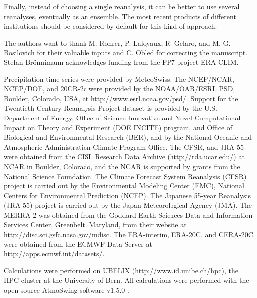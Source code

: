 \documentclass{ametsoc}
\begin{document}
	Finally, instead of choosing a single reanalysis, it can be better to use several reanalyses, eventually as an ensemble. The most recent products of different institutions should be considered by default for this kind of approach.
	
	
	
	
	
	\acknowledgments
	The authors want to thank M. Rohrer, P. Laloyaux, R. Gelaro, and M. G. Bosilovich for their valuable inputs and C. Obled for correcting the manuscript. Stefan Br\"{o}nnimann acknowledges funding from the FP7 project ERA-CLIM.
	
	Precipitation time series were provided by MeteoSwiss. The NCEP/NCAR, NCEP/DOE, and 20CR-2c were provided by the NOAA/OAR/ESRL PSD, Boulder, Colorado, USA, at http://www.esrl.noaa.gov/psd/. Support for the Twentieth Century Reanalysis Project dataset is provided by the U.S. Department of Energy, Office of Science Innovative and Novel Computational Impact on Theory and Experiment (DOE INCITE) program, and Office of Biological and Environmental Research (BER), and by the National Oceanic and Atmospheric Administration Climate Program Office. The CFSR, and JRA-55 were obtained from the CISL Research Data Archive (http://rda.ucar.edu/) at NCAR in Boulder, Colorado, and the NCAR is supported by grants from the National Science Foundation. The Climate Forecast System Reanalysis (CFSR) project is carried out by the Environmental Modeling Center (EMC), National Centers for Environmental Prediction (NCEP). The Japanese 55-year Reanalysis (JRA-55) project is carried out by the Japan Meteorological Agency (JMA). The MERRA-2 was obtained from the Goddard Earth Sciences Data and Information Services Center, Greenbelt, Maryland, from their website at http://disc.sci.gsfc.nasa.gov/mdisc. The ERA-interim, ERA-20C, and CERA-20C were obtained from the ECMWF Data Server at http://apps.ecmwf.int/datasets/. 
	
	Calculations were performed on UBELIX (http://www.id.unibe.ch/hpc), the HPC cluster at the University of Bern. All calculations were performed with the open source AtmoSwing software v1.5.0 \citep{Horton2017a}.
	
	
	
\end{document}
